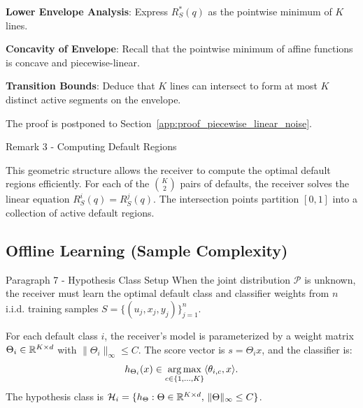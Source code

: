 \begin{guideblock}
\item \textbf{Lower Envelope Analysis}: Express $R_S^*(q)$ as the pointwise minimum of $K$ lines.
\item \textbf{Concavity of Envelope}: Recall that the pointwise minimum of affine functions is concave and piecewise-linear.
\item \textbf{Transition Bounds}: Deduce that $K$ lines can intersect to form at most $K$ distinct active segments on the envelope.
\end{guideblock}
The proof is postponed to Section~\ref{app:proof_piecewise_linear_noise}.

\begin{sourceblock}{Remark 3 - Computing Default Regions}
\begin{remark}
This geometric structure allows the receiver to compute the optimal default regions efficiently. For each of the $\binom{K}{2}$ pairs of defaults, the receiver solves the linear equation $R^i_S(q) = R^j_S(q)$. The intersection points partition $[0, 1]$ into a collection of active default regions.
\end{remark}
\end{sourceblock}

\begin{faqblock}
\faqanswers
{}
\end{faqblock}

\subsection{Offline Learning (Sample Complexity)}
\label{sec:classification_offline}

\begin{sourceblock}{Paragraph 7 - Hypothesis Class Setup}
When the joint distribution $\mathcal{P}$ is unknown, the receiver must learn the optimal default class and classifier weights from $n$ i.i.d. training samples $S = \{(u_j, x_j, y_j)\}_{j=1}^n$. 

For each default class $i$, the receiver's model is parameterized by a weight matrix $\Theta_i \in \mathbb{R}^{K \times d}$ with $\|\Theta_i\|_\infty \le C$. The score vector is $s = \Theta_i x$, and the classifier is:
\begin{equation}
    \label{eq:multiclass_classifier_form}
    h_{\Theta_i}(x) \in \operatorname*{arg\,max}_{c \in \{1, \dots, K\}} \langle \theta_{i,c}, x \rangle.
\end{equation}
The hypothesis class is $\mathcal{H}_i = \{h_{\Theta} : \Theta \in \mathbb{R}^{K \times d}, \, \|\Theta\|_\infty \le C\}$. 
\end{sourceblock}

